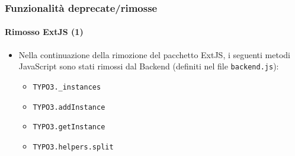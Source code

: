 \begin{frame}[fragile]
	\frametitle{Funzionalità deprecate/rimosse}
	\framesubtitle{Rimosso ExtJS (1)}

	\begin{itemize}
		\item Nella continuazione della rimozione del pacchetto ExtJS, i seguenti metodi JavaScript sono stati rimossi
			dal Backend (definiti nel file \texttt{backend.js}):

		\begin{itemize}
			\item \texttt{TYPO3.\_instances}
			\item \texttt{TYPO3.addInstance}
			\item \texttt{TYPO3.getInstance}
			\item \texttt{TYPO3.helpers.split}
		\end{itemize}

	\end{itemize}

\end{frame}
